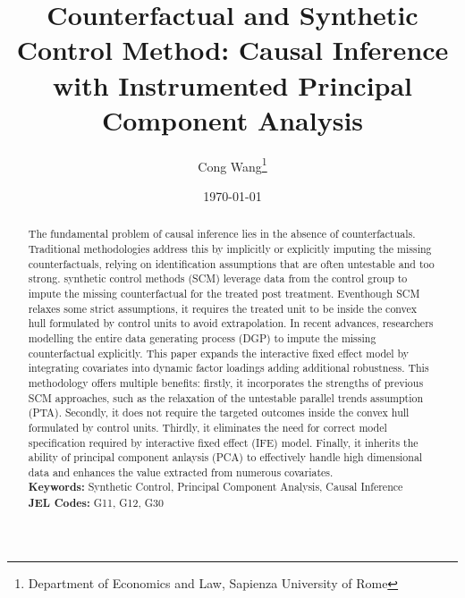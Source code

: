 \documentclass[12pt]{article}
\begin{document}
\newtheorem{assumption}{Assumption}

\begin{titlepage}
\title{Counterfactual and Synthetic Control Method: Causal Inference with Instrumented Principal Component Analysis}
\author{ Cong Wang\thanks{Department of Economics and Law, Sapienza University of Rome}}
\date{\today}
\maketitle
\begin{abstract}
\noindent The fundamental problem of causal inference lies in the absence of counterfactuals. Traditional methodologies address this by implicitly or explicitly imputing the missing counterfactuals, relying on identification assumptions that are often untestable and too strong. synthetic control methods (SCM) leverage data from the control group to impute the missing counterfactual for the treated post treatment. Eventhough SCM relaxes some strict assumptions, it requires the treated unit to be inside the convex hull formulated by control units to avoid extrapolation. In recent advances, researchers modelling the entire data generating process (DGP) to impute the missing counterfactual explicitly. This paper expands the interactive fixed effect model by integrating covariates into dynamic factor loadings adding additional robustness. This methodology offers multiple benefits: firstly, it incorporates the strengths of previous SCM approaches, such as the relaxation of the untestable parallel trends assumption (PTA). Secondly, it does not require the targeted outcomes inside the convex hull formulated by control units. Thirdly, it eliminates the need for correct model specification required by interactive fixed effect (IFE) model. Finally, it inherits the ability of principal component anlaysis (PCA) to effectively handle high dimensional data and enhances the value extracted from numerous covariates.\\

\noindent\textbf{Keywords:} Synthetic Control, Principal Component Analysis, Causal Inference\\

\noindent\textbf{JEL Codes:} G11, G12, G30\\
\bigskip
\end{abstract}
\setcounter{page}{0}
\thispagestyle{empty}
\end{titlepage}
\pagebreak \newpage
\end{document}

